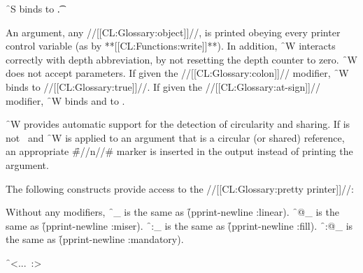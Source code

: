 \f{~S} binds  to \t.


\endsubsubsection%


An argument, any //[[CL:Glossary:object]]//, is printed obeying every printer control
variable (as by **[[CL:Functions:write]]**).  In addition, \f{~W} interacts correctly with depth
abbreviation, by not resetting the depth counter to zero.  \f{~W} does not
accept parameters.  If given the //[[CL:Glossary:colon]]// modifier, \f{~W} binds 
to //[[CL:Glossary:true]]//.  If given the //[[CL:Glossary:at-sign]]// modifier, \f{~W} binds 
and  to \nil.
 
\f{~W} provides automatic support for the detection of circularity and
sharing.  If  is not \nil\ and \f{~W} is applied
to an argument that is a circular (or shared) reference, an appropriate 
\f{\#//n//\#} marker is inserted in the output instead of printing the argument.
 
\endsubsubsection%


\endsubsection%



The following constructs provide access to the //[[CL:Glossary:pretty printer]]//:


Without any modifiers, \f{~_} is the same as \f{(pprint-newline :linear)}.
\f{~@_}  is the same as \f{(pprint-newline :miser)}.
\f{~:_}  is the same as \f{(pprint-newline :fill)}.
\f{~:@_} is the same as \f{(pprint-newline :mandatory)}.

\endsubsubsection%


\f{~<...~:>}

